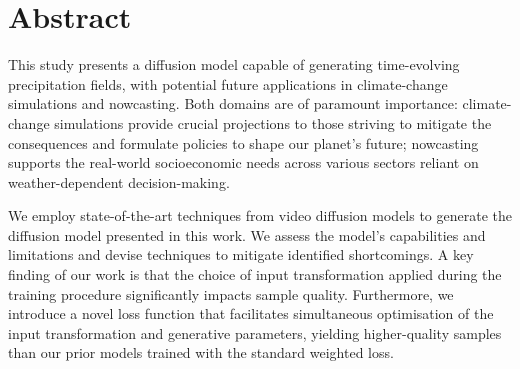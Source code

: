 \documentclass[ oneside,%
                    author={George Herbert},
                    degree={MSci},
                     title={Diffusion Models for Time-Evolving Precipitation Fields},
                  subtitle={}]{dissertation}
\begin{document}


\maketitle


\frontmatter





\chapter*{Abstract}

This study presents a diffusion model capable of generating time-evolving precipitation fields, with potential future applications in climate-change simulations and nowcasting. Both domains are of paramount importance: climate-change simulations provide crucial projections to those striving to mitigate the consequences and formulate policies to shape our planet's future; nowcasting supports the real-world socioeconomic needs across various sectors reliant on weather-dependent decision-making.

We employ state-of-the-art techniques from video diffusion models to generate the diffusion model presented in this work. We assess the model's capabilities and limitations and devise techniques to mitigate identified shortcomings. A key finding of our work is that the choice of input transformation applied during the training procedure significantly impacts sample quality. Furthermore, we introduce a novel loss function that facilitates simultaneous optimisation of the input transformation and generative parameters, yielding higher-quality samples than our prior models trained with the standard weighted loss.
\end{document}
